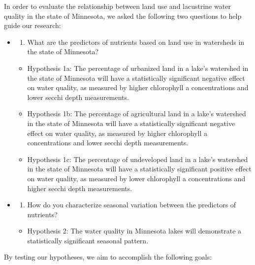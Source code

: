 \documentclass[12pt,]{article}
\providecommand{\tightlist}{%
  \setlength{\itemsep}{0pt}\setlength{\parskip}{0pt}}
\begin{document}
In order to evaluate the relationship between land use and lacustrine
water quality in the state of Minnesota, we asked the following two
questions to help guide our research:

\begin{itemize}
\item
  \begin{enumerate}
  \def\labelenumi{\arabic{enumi}.}
  \tightlist
  \item
    What are the predictors of nutrients based on land use in watersheds
    in the state of Minnesota?
  \end{enumerate}

  \begin{itemize}
  \tightlist
  \item
    Hypothesis 1a: The percentage of urbanized land in a lake's
    watershed in the state of Minnesota will have a statistically
    significant negative effect on water quality, as measured by higher
    chlorophyll a concentrations and lower secchi depth measurements.
  \item
    Hypothesis 1b: The percentage of agricultural land in a lake's
    watershed in the state of Minnesota will have a statistically
    significant negative effect on water quality, as measured by higher
    chlorophyll a concentrations and lower secchi depth measurements.
  \item
    Hypothesis 1c: The percentage of undeveloped land in a lake's
    watershed in the state of Minnesota will have a statistically
    significant positive effect on water quality, as measured by lower
    chlorophyll a concentrations and higher secchi depth measurements.
  \end{itemize}
\item
  \begin{enumerate}
  \def\labelenumi{\arabic{enumi}.}
  \setcounter{enumi}{1}
  \tightlist
  \item
    How do you characterize seasonal variation between the predictors of
    nutrients?
  \end{enumerate}

  \begin{itemize}
  \tightlist
  \item
    Hypothesis 2: The water quality in Minnesota lakes will demonstrate
    a statistically significant seasonal pattern.
  \end{itemize}
\end{itemize}

By testing our hypotheses, we aim to accomplish the following goals:
\end{document}
